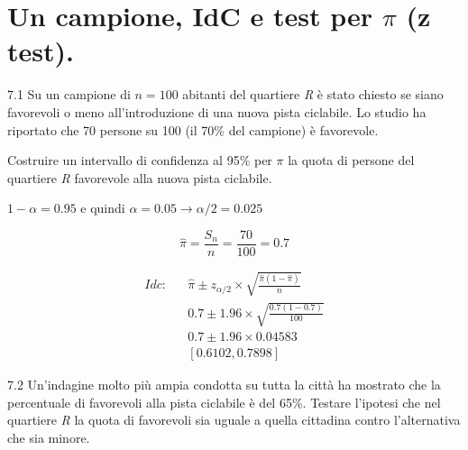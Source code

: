 \documentclass[
  11pt,
]{book}
\theoremstyle{mytheoremstyle}
\theoremstyle{mydefstyle}
\newenvironment{sol}
  {
  \begin{tcolorbox}[enhanced,breakable,arc=0.1mm,boxrule=1pt,colback=white,colframe=iblue,
  title=\bf \fontfamily{lmss}\selectfont \hspace{.5 cm} Soluzione,drop fuzzy shadow]

}{
\end{tcolorbox}
  }
\begin{document}
\section{\texorpdfstring{Un campione, IdC e test per \(\pi\) (z test).}{Un campione, IdC e test per \textbackslash pi (z test).}}\label{un-campione-idc-e-test-per-pi-z-test.}

7.1 Su un campione di \(n = 100\) abitanti del quartiere \emph{R} è stato chiesto se siano favorevoli o meno all'introduzione di una nuova pista ciclabile. Lo studio ha riportato che 70 persone su 100 (il 70\% del campione) è favorevole.

Costruire un intervallo di confidenza al 95\% per \(\pi\) la quota di persone del quartiere \emph{R} favorevole alla nuova pista ciclabile.

\begin{sol}
\(1-\alpha =0.95\) e quindi \(\alpha=0.05\rightarrow \alpha/2=0.025\)

\[
  \hat\pi = \frac{S_n}n = \frac{ 70 }{ 100 }= 0.7 
\]

\begin{eqnarray*}
  Idc: & &  \hat\pi \pm  z_{\alpha/2} \times \sqrt{\frac{\hat\pi(1-\hat\pi)}{n}} \\
     & &  0.7 \pm  1.96 \times \sqrt{\frac{ 0.7 (1- 0.7 )}{ 100 }} \\
     & &  0.7 \pm  1.96 \times  0.04583 \\
     & & [ 0.6102 ,  0.7898 ]
\end{eqnarray*}

\end{sol}

7.2 Un'indagine molto più ampia condotta su tutta la città ha mostrato che
la percentuale di favorevoli alla pista ciclabile è del 65\%. Testare l'ipotesi che nel quartiere \emph{R} la quota di favorevoli sia uguale a quella cittadina contro l'alternativa che sia minore.
\end{document}
